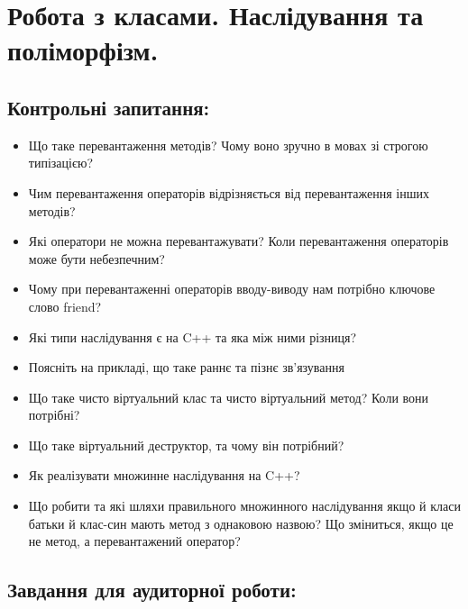 \documentclass[a5paper,titlepage,openany,twoside,draft]{book_unv}%
\begin{document}
\chapter{Робота з класами. Наслідування та поліморфізм.}
%

\section{Контрольні запитання:}
\begin{itemize}
\item
  Що таке перевантаження методів? Чому воно зручно в мовах зі строгою
  типізацією?
\item
  Чим перевантаження операторів відрізняється від перевантаження інших
  методів?
\item
  Які оператори не можна перевантажувати? Коли перевантаження операторів
  може бути небезпечним?
\item
  Чому при перевантаженні операторів вводу-виводу нам потрібно ключове
  слово friend?
\item
  Які типи наслідування є на C++ та яка між ними різниця?
\item
  Поясніть на прикладі, що таке раннє та пізнє зв'язування
\item
  Що таке чисто віртуальний клас та чисто віртуальний метод? Коли вони
  потрібні?
\item
  Що таке віртуальний деструктор, та чому він потрібний?
\item
  Як реалізувати множинне наслідування на C++?
\item
  Що робити та які шляхи правильного множинного наслідування якщо й
  класи батьки й клас-син мають метод з однаковою назвою? Що зміниться,
  якщо це не метод, а перевантажений оператор?
\end{itemize}

\section{Завдання для аудиторної роботи:}
\end{document}
